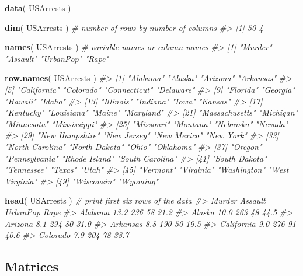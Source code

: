 \documentclass[]{book}
\newenvironment{Shaded}{\begin{snugshade}}{\end{snugshade}}
\newcommand{\CommentTok}[1]{\textcolor[rgb]{0.56,0.35,0.01}{\textit{#1}}}
\newcommand{\KeywordTok}[1]{\textcolor[rgb]{0.13,0.29,0.53}{\textbf{#1}}}
\newcommand{\NormalTok}[1]{#1}
\theoremstyle{definition}
\theoremstyle{definition}
\theoremstyle{definition}
\theoremstyle{remark}
\begin{document}
\begin{Shaded}
\begin{Highlighting}[]

\KeywordTok{data}\NormalTok{( USArrests )}

\KeywordTok{dim}\NormalTok{( USArrests )   }\CommentTok{# number of rows by number of columns}
\CommentTok{#> [1] 50  4}

\KeywordTok{names}\NormalTok{( USArrests )   }\CommentTok{# variable names or column names}
\CommentTok{#> [1] "Murder"   "Assault"  "UrbanPop" "Rape"}

\KeywordTok{row.names}\NormalTok{( USArrests )}
\CommentTok{#>  [1] "Alabama"        "Alaska"         "Arizona"        "Arkansas"      }
\CommentTok{#>  [5] "California"     "Colorado"       "Connecticut"    "Delaware"      }
\CommentTok{#>  [9] "Florida"        "Georgia"        "Hawaii"         "Idaho"         }
\CommentTok{#> [13] "Illinois"       "Indiana"        "Iowa"           "Kansas"        }
\CommentTok{#> [17] "Kentucky"       "Louisiana"      "Maine"          "Maryland"      }
\CommentTok{#> [21] "Massachusetts"  "Michigan"       "Minnesota"      "Mississippi"   }
\CommentTok{#> [25] "Missouri"       "Montana"        "Nebraska"       "Nevada"        }
\CommentTok{#> [29] "New Hampshire"  "New Jersey"     "New Mexico"     "New York"      }
\CommentTok{#> [33] "North Carolina" "North Dakota"   "Ohio"           "Oklahoma"      }
\CommentTok{#> [37] "Oregon"         "Pennsylvania"   "Rhode Island"   "South Carolina"}
\CommentTok{#> [41] "South Dakota"   "Tennessee"      "Texas"          "Utah"          }
\CommentTok{#> [45] "Vermont"        "Virginia"       "Washington"     "West Virginia" }
\CommentTok{#> [49] "Wisconsin"      "Wyoming"}

\KeywordTok{head}\NormalTok{( USArrests )  }\CommentTok{# print first six rows of the data}
\CommentTok{#>            Murder Assault UrbanPop Rape}
\CommentTok{#> Alabama      13.2     236       58 21.2}
\CommentTok{#> Alaska       10.0     263       48 44.5}
\CommentTok{#> Arizona       8.1     294       80 31.0}
\CommentTok{#> Arkansas      8.8     190       50 19.5}
\CommentTok{#> California    9.0     276       91 40.6}
\CommentTok{#> Colorado      7.9     204       78 38.7}
\end{Highlighting}
\end{Shaded}

\hypertarget{matrices}{%
\subsection{Matrices}\label{matrices}}
\end{document}
